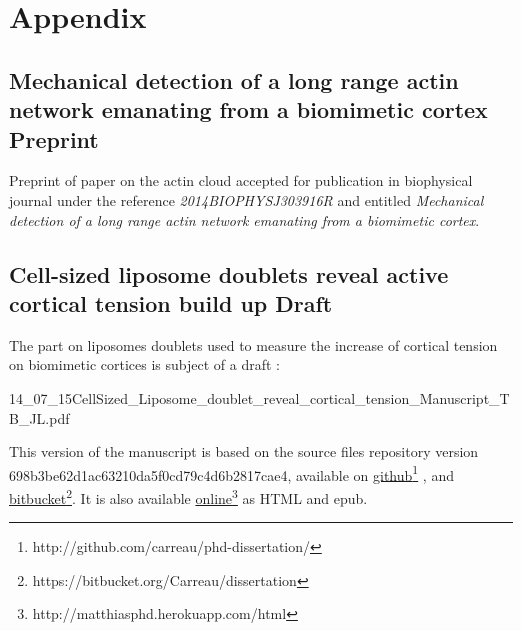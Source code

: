 \documentclass[A4paperpaper,11pt,english]{sphinxmanual}
\begin{document}
\chapter{Appendix}
\label{index-latex:appendix}\label{index-latex::doc}

\section{Mechanical detection of a long range actin network emanating from a biomimetic cortex Preprint}
\label{index-latex:mechanical-detection-of-a-long-range-actin-network-emanating-from-a-biomimetic-cortex-preprint}
Preprint of paper on the actin cloud accepted for publication in biophysical
journal under the reference \emph{2014BIOPHYSJ303916R} and entitled \emph{Mechanical
detection of a long range actin network emanating from a biomimetic cortex}.



\section{Cell-sized liposome doublets reveal active cortical tension build up Draft}
\label{index-latex:cell-sized-liposome-doublets-reveal-active-cortical-tension-build-up-draft}
The part on liposomes doublets used to measure the increase of cortical tension
on biomimetic cortices is subject of a draft :

{14_07_15CellSized_Liposome_doublet_reveal_cortical_tension_Manuscript_TB_JL.pdf}


This version of the manuscript is based on the source files repository version
698b3be62d1ac63210da5f0cd79c4d6b2817cae4, available on \href{http://github.com/carreau/phd-dissertation/}{github}\footnote{http://github.com/carreau/phd-dissertation/}
, and \href{https://bitbucket.org/Carreau/dissertation}{bitbucket}\footnote{https://bitbucket.org/Carreau/dissertation}. It is also available \href{http://matthiasphd.herokuapp.com/html}{online}\footnote{http://matthiasphd.herokuapp.com/html} as HTML and epub.
\end{document}
